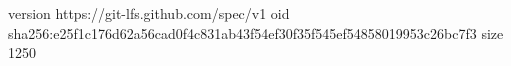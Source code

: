 version https://git-lfs.github.com/spec/v1
oid sha256:e25f1c176d62a56cad0f4c831ab43f54ef30f35f545ef54858019953c26bc7f3
size 1250
